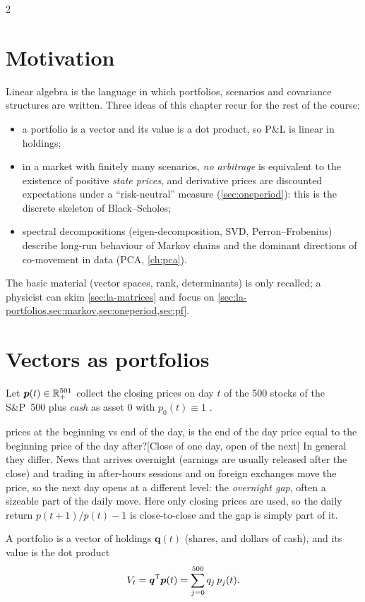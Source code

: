 \begin{paracol}{2}
\section*{Motivation}
Linear algebra is the language in which portfolios, scenarios and covariance structures are
written. Three ideas of this chapter recur for the rest of the course:
\begin{itemize}
  \item a portfolio is a vector and its value is a dot product, so P\&L is linear in holdings;
  \item in a market with finitely many scenarios, \emph{no arbitrage} is equivalent to the
        existence of positive \emph{state prices}, and derivative prices are discounted expectations
        under a ``risk-neutral'' measure (\cref{sec:oneperiod}): this is the discrete skeleton of
        Black--Scholes;
  \item spectral decompositions (eigen-decomposition, SVD, Perron--Frobenius) describe long-run
        behaviour of Markov chains and the dominant directions of co-movement in data (PCA,
        \cref{ch:pca}).
\end{itemize}
The basic material (vector spaces, rank, determinants) is only recalled; a physicist can skim
\cref{sec:la-matrices} and focus on \cref{sec:la-portfolios,sec:markov,sec:oneperiod,sec:pf}.

\section{Vectors as portfolios}\label{sec:la-portfolios}

Let $\bm p(t)\in\mathbb{R}^{501}_{+}$ collect the closing prices on day $t$ of the 500 stocks of the S\&P~500
plus \emph{cash} as asset $0$ with $p_0(t)\equiv 1$ .\begin{answer}{prices at the beginning vs end of the day, is the end of the day price equal to the beginning price of the day after?}[Close of one day, open of the next]
In general they differ. News that arrives overnight (earnings are usually released after the close)
and trading in after-hours sessions and on foreign exchanges move the price, so the next day opens
at a different level: the \emph{overnight gap}, often a sizeable part of the daily move. Here only
closing prices are used, so the daily return $p(t+1)/p(t)-1$ is close-to-close and the gap is
simply part of it.
\end{answer} A portfolio is a vector of holdings
$\bm q(t)$ (shares, and dollars of cash), and its value is the dot product
\[
  V_t = \bm q^{\mathsf T}\bm p(t) = \sum_{j=0}^{500} q_j\,p_j(t).
\]


\end{paracol}
